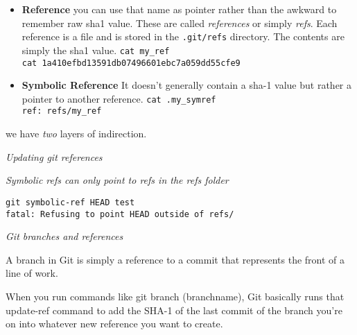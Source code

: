 \begin{itemize}
  \item \textbf{Reference} 
  you can use that name as pointer rather than the awkward 
  to remember raw sha1 value.
  These are called \textit{references} or simply 
  \textit{refs}. Each reference is a file and is stored 
  in the \lstinline{.git/refs} directory. 
  The contents are simply the sha1 value. 
  \lstinline{cat my_ref}\\
  \lstinline{cat 1a410efbd13591db07496601ebc7a059dd55cfe9}
  \item \textbf{Symbolic Reference}
    It doesn’t generally contain a sha-1 value but rather a
    pointer to another reference. 
    \lstinline{cat .my_symref}\\
    \lstinline{ref: refs/my_ref}
\end{itemize}


we have \textit{two} layers of indirection. 

\frmrule 

\textit{Updating git references}


\frmrule 

\textit{Symbolic refs can only point to refs in the refs folder}

\lstinline{git symbolic-ref HEAD test}\\
\lstinline{fatal: Refusing to point HEAD outside of refs/}

\frmrule

\textit{Git branches and references}

A branch in Git is simply a reference to a commit 
that represents the front of a line of work. 

When you run commands like git branch (branchname), Git
basically runs that update-ref command to add the SHA-1
of the last commit of the branch you’re on into whatever
new reference you want to create.  


